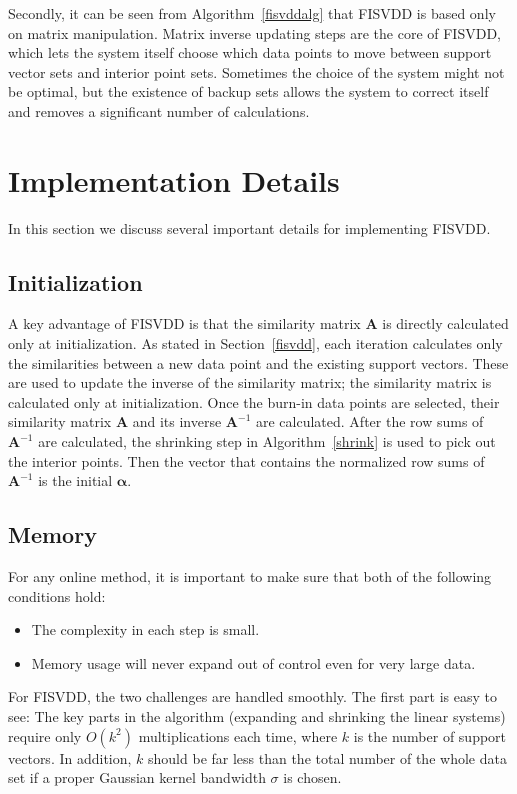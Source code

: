 \documentclass{article}
\newcommand{\sref}[1]{Section~\ref{#1}}
\newcommand{\aref}[1]{Algorithm~\ref{#1}}
\numberwithin{equation}{section}
\begin{document}
Secondly, it can be seen from \aref{fisvddalg} that FISVDD is based only on matrix manipulation. Matrix inverse updating steps are the core of FISVDD, which lets the system itself choose which data points to move between support vector sets and interior point sets. Sometimes the choice of the system might not be optimal, but the existence of backup sets allows the system to correct itself and removes a significant number of calculations.






\section{Implementation Details}\label{misc}
In this section we discuss several important details for implementing FISVDD.

\subsection{Initialization}
A key advantage of FISVDD is that the similarity matrix $\mathbf{A}$ is directly calculated only at initialization. As stated in \sref{fisvdd}, each iteration calculates only the similarities between a new data point and the existing support vectors. These are used to update the inverse of the similarity matrix; the similarity matrix is calculated only at initialization. Once the burn-in data points are selected, their similarity matrix $\mathbf{A}$ and its inverse $\mathbf{A}^{-1}$ are calculated. After the row sums of $\mathbf{A}^{-1}$ are calculated, the shrinking step in \aref{shrink} is used to pick out the interior points. Then the vector that contains the normalized row sums of $\mathbf{A}^{-1}$ is the initial $\boldsymbol{\alpha}$.

\subsection{Memory}
For any online method, it is important to make sure that both of the following conditions hold:
\begin{itemize}
\item The complexity in each step is small.
\item Memory usage will never expand out of control even for very large data.
\end{itemize}  
For FISVDD, the two challenges are handled smoothly. The first part is easy to see: The key parts in the algorithm (expanding and shrinking the linear systems) require only $O(k^2)$ multiplications each time, where $k$ is the number of support vectors. In addition, $k$ should be far less than the total number of the whole data set if a proper Gaussian kernel bandwidth $\sigma$ is chosen.  
\end{document}
